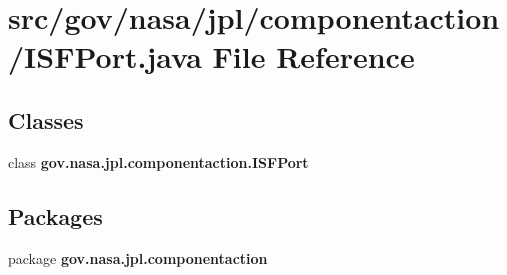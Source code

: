 \section{src/gov/nasa/jpl/componentaction/\+I\+S\+F\+Port.java File Reference}
\label{_i_s_f_port_8java}
\subsection*{Classes}
\begin{DoxyCompactItemize}
\item 
class {\bf gov.\+nasa.\+jpl.\+componentaction.\+I\+S\+F\+Port}
\end{DoxyCompactItemize}
\subsection*{Packages}
\begin{DoxyCompactItemize}
\item 
package {\bf gov.\+nasa.\+jpl.\+componentaction}
\end{DoxyCompactItemize}
